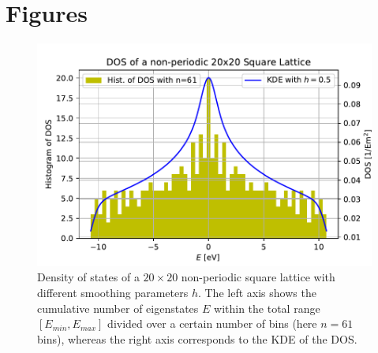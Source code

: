 
\setcounter{figure}{0}
\section{Figures}\label{figures}

\begin{figure}[H]
    \centering
    \includegraphics[width=.6\textwidth]{img/DOS_20x20_square_lattice.pdf}
    \caption{Density of states of a $20\times 20$ non-periodic square lattice with different smoothing parameters $h$. The left axis shows the cumulative number of eigenstates $E$ within the total range $[E_{min},E_{max}]$ divided over a certain number of bins (here $n=61$ bins), whereas the right axis corresponds to the KDE of the DOS.}
    \label{fig:DOS_square_lattice}
\end{figure}

